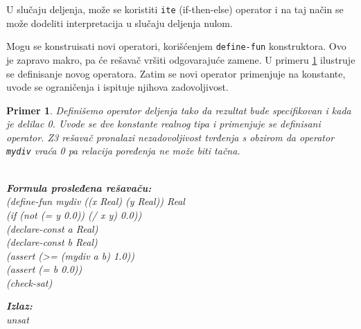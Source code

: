 \documentclass[12pt,oneside]{memoir}
\newcommand\tab[1][0.5cm]{\hspace*{#1}}
\newtheorem{primer}{Primer}
\begin{document}
U slučaju deljenja, može se koristiti \texttt{ite} (if-then-else) operator i na taj način se može dodeliti interpretacija u slučaju deljenja nulom.
\par
Mogu se konstruisati novi operatori, korišćenjem \texttt{define-fun} konstruktora. Ovo je zapravo makro, pa će rešavač vršiti odgovarajuće zamene. U primeru \ref{example4} ilustruje se definisanje novog operatora. Zatim se novi operator primenjuje na konstante, uvode se ograničenja i ispituje njihova zadovoljivost.
\begin{primer} \label{example4}
Definišemo operator deljenja tako da rezultat bude specifikovan i kada je delilac 0. Uvode se dve konstante realnog tipa i primenjuje se definisani operator. Z3 rešavač pronalazi nezadovoljivost tvrđenja s obzirom da operator \texttt{mydiv} vraća 0 pa relacija poređenja ne može biti tačna.\\ \\
\begin{minipage}[b]{0.5\textwidth}
\textbf{Formula prosleđena rešavaču:}
\\(define-fun mydiv ((x Real) (y Real)) Real
\\\tab (if (not (= y 0.0))  (/ x y)  0.0))
\\(declare-const a Real)
\\(declare-const b Real)
\\(assert (>= (mydiv a b) 1.0))
\\(assert (= b 0.0))
\\(check-sat)
\end{minipage}
\hspace{3cm}
\begin{minipage}[t]{0.4\textwidth}
\vspace{-4.73cm}
\textbf{Izlaz:}
\\unsat
\end{minipage}
\end{primer}
\par
\end{document}
